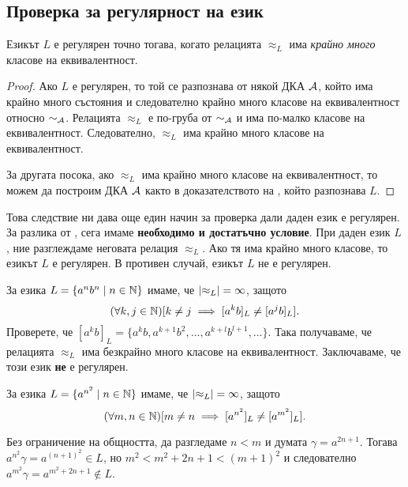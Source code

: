 \subsection{Проверка за регулярност на език}

\begin{framed}
  \begin{prop}
    Езикът $L$ е регулярен точно тогава, когато релацията $\approx_L$ има {\em крайно много} класове на еквивалентност.
  \end{prop}
\end{framed}
\begin{proof}
  Ако $L$ е регулярен, то той се разпознава от някой ДКА $\mathcal{A}$, който има крайно много състояния 
  и следователно крайно много класове на еквивалентност относно $\sim_{\mathcal{A}}$.
  Релацията $\approx_L$ е по-груба от $\sim_{\mathcal{A}}$ и има по-малко класове на еквивалентност.
  Следователно, $\approx_L$ има крайно много класове на еквивалентност.
  
  За другата посока, ако $\approx_L$ има крайно много класове на еквивалентност, то можем да 
  построим ДКА $\mathcal{A}$ както в доказателството на , който разпознава $L$.
\end{proof}

Това следствие ни дава още един начин за проверка дали даден език е регулярен.
За разлика от , сега имаме {\bf необходимо и достатъчно условие}.
При даден език $L$, ние разглеждаме неговата релация $\approx_L$.
Ако тя има крайно много класове, то езикът $L$ е регулярен.
В противен случай, езикът $L$ не е регулярен.

\begin{example}
  За езика $L = \{a^nb^n\mid n \in \mathbb{N}\}$ имаме, че $\lvert{\approx_L}\rvert = \infty$,
  защото \[(\forall k,j\in\mathbb{N})[k \neq j \implies [a^kb]_L \neq [a^jb]_L].\]
  Проверете, че $[a^kb]_L = \{a^kb,a^{k+1}b^{2},\dots,a^{k+l}b^{l+1},\dots\}$.
  Така получаваме, че релацията $\approx_L$ има безкрайно много класове на еквивалентност.
  Заключаваме, че този език {\bf не} е регулярен.
\end{example}

\begin{example}
  За езика $L = \{a^{n^2} \mid n \in \mathbb{N}\}$ имаме, че $\lvert{\approx_L}\rvert = \infty$,
  защото \[(\forall m,n\in\mathbb{N})[m \neq n \implies [a^{n^2}]_L \neq [a^{m^2}]_L].\]
  
  Без ограничение на общността, да разгледаме $n < m$ и думата $\gamma = a^{2n+1}$.
  Тогава $a^{n^2}\gamma = a^{(n+1)^2} \in L$, но 
  $m^2 < m^2 + 2n + 1 < (m+1)^2$ и следователно $a^{m^2}\gamma = a^{m^2+2n+1}\not\in L$.
\end{example}


